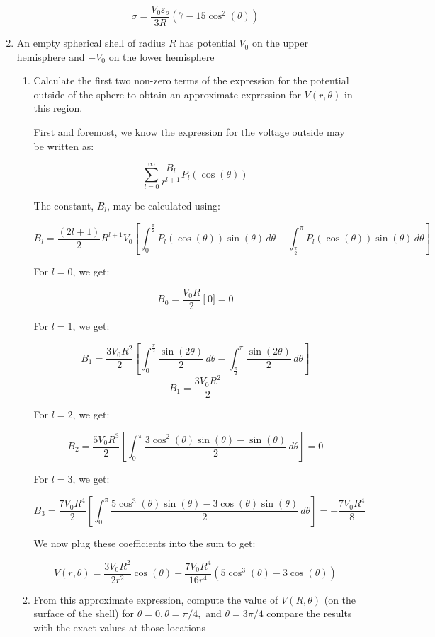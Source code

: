 \begin{enumerate}
\begin{enumerate}
        $$\sigma=\frac{V_0\varepsilon_o}{3R}\left( 7-15\cos^2(\theta)\right)$$

    \end{enumerate}

  \item An empty spherical shell of radius $R$ has potential $V_0$ on the upper hemisphere and $−V_0$ on the lower hemisphere

    \begin{enumerate}

      \item Calculate the first two non-zero terms of the expression for the potential outside of the sphere to obtain an approximate expression for $V(r, \theta)$ in this region.

        First and foremost, we know the expression for the voltage outside may be written as:

        $$\sum_{l=0}^{\infty}\frac{B_l}{r^{l+1}}P_l(\cos(\theta))$$

        The constant, $B_l$, may be calculated using:

        $$B_l=\frac{(2l+1)}{2}R^{l+1}V_0\left[ \int_0^{\frac{\pi}{2}}P_l(\cos(\theta))\sin(\theta)\,d\theta-\int_{\frac{\pi}{2}}^\pi P_l(\cos(\theta))\sin(\theta)\,d\theta \right]$$

        For $l=0$, we get:

        $$B_0=\frac{V_0R}{2}\left[0]=0$$

        For $l=1$, we get:

        $$B_1=\frac{3V_0R^2}{2}\left[ \int_0^{\frac{\pi}{2}}\frac{\sin(2\theta)}{2}\,d\theta-\int_{\frac{\pi}{2}}^{\pi}\frac{\sin(2\theta)}{2}\,d\theta \right]$$
        $$B_1=\frac{3V_0R^2}{2}$$

        For $l=2$, we get:

        $$B_2=\frac{5V_0R^3}{2}\left[  \int_0^{\pi}\frac{3\cos^2(\theta)\sin(\theta)-\sin(\theta)}{2}\,d\theta\right]=0$$

        For $l=3$, we get:

        $$B_3=\frac{7V_0R^4}{2}\left[  \int_0^{\pi}\frac{5\cos^3(\theta)\sin(\theta)-3\cos(\theta)\sin(\theta)}{2}\,d\theta\right]=-\frac{7V_0R^4}{8}$$

        We now plug these coefficients into the sum to get:

        $$\boxed{V(r,\theta)=\frac{3V_0R^2}{2r^2}\cos(\theta)-\frac{7V_0R^4}{16r^4}\left( 5\cos^3(\theta)-3\cos(\theta) \right)}$$

      \item From this approximate expression, compute the value of $V(R, \theta)$ (on the surface of the shell) for $\theta = 0, \theta = \pi/4,$ and $\theta = 3\pi/4$ compare the results with the exact values at those locations


\end{enumerate}
\end{enumerate}
